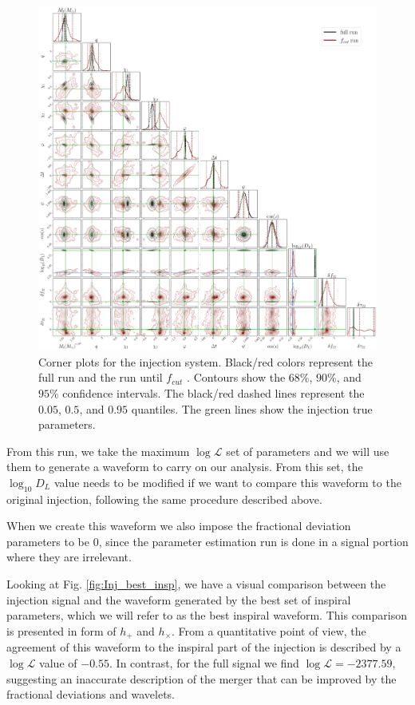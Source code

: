 \begin{figure}[h!]
    \centering
    \includegraphics[width=1\textwidth]{Images/Corner_full_fcut.pdf}
    \caption{Corner plots for the injection system. Black/red colors represent the full run and the run until $f_{cut}$ . Contours show the $68\%$, $90\%$, and $95\%$ confidence intervals. The black/red dashed lines represent the $0.05$, $0.5$, and $0.95$ quantiles. The green lines show the injection true parameters.}
    \label{fig:Corner_full_fcut} 
\end{figure}


From this run, we take the maximum $\log \mathcal{L}$ set of parameters and we will use them to generate a waveform to carry on our analysis. From this set, the $\log_{10} D_L$ value needs to be modified if we want to compare this waveform to the original injection, following the same procedure described above.  

When we create this waveform we also impose the fractional deviation parameters to be $0$, since the parameter estimation run is done in a signal portion where they are irrelevant.

Looking at Fig. \ref{fig:Inj_best_insp}, we have a visual comparison between the injection signal and the waveform generated by the best set of inspiral parameters, which we will refer to as the best inspiral waveform. This comparison is presented in form of $h_{+}$ and $h_{\times}$. From a quantitative point of view, the agreement of this waveform to the inspiral part of the injection is described by a $\log \mathcal{L}$ value of $ -0.55$. In contrast, for the full signal we find $\log \mathcal{L} = -2377.59$, suggesting an inaccurate description of the merger that can be improved by the fractional deviations and wavelets.

